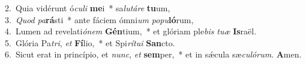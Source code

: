 {2.~}Quia vidérunt ó\textit{cu}\textit{li} \textbf{me}i~* sa\textit{lu}\textit{tá}\textit{re} \textbf{tu}um,\\
{3.~}\textit{Quod} \textit{pa}\textbf{rá}sti~* ante fáciem ómni\textit{um} \textit{po}\textit{pu}\textbf{ló}rum,\\
{4.~}Lumen ad revelati\textit{ó}\textit{nem} \textbf{Gén}tium,~* et glóriam ple\textit{bis} \textit{tu}\textit{æ} \textbf{Is}raël.\\
{5.~}Glória Pa\textit{tri}, \textit{et} \textbf{Fí}lio,~* et Spi\textit{rí}\textit{tu}\textit{i} \textbf{San}cto.\\
{6.~}Sicut erat in princípio, et \textit{nunc}, \textit{et} \textbf{sem}per,~* et in sǽcula sæ\textit{cu}\textit{ló}\textit{rum}. \textbf{A}men.\\
